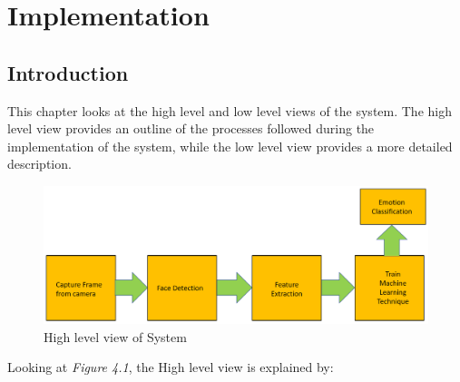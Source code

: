 \chapter{Implementation} %
%


\section{Introduction} %
This chapter looks at the high level and low level views of the system. The high level view provides an outline of the processes followed during the implementation of the system, while the low level view provides a more detailed description. 

\begin{figure}[H]
  \centering
  \includegraphics[scale=0.2]{pres1}
  \caption{High level view of System}
\end{figure} 
Looking at \textit{Figure 4.1}, the High level view is explained by:

